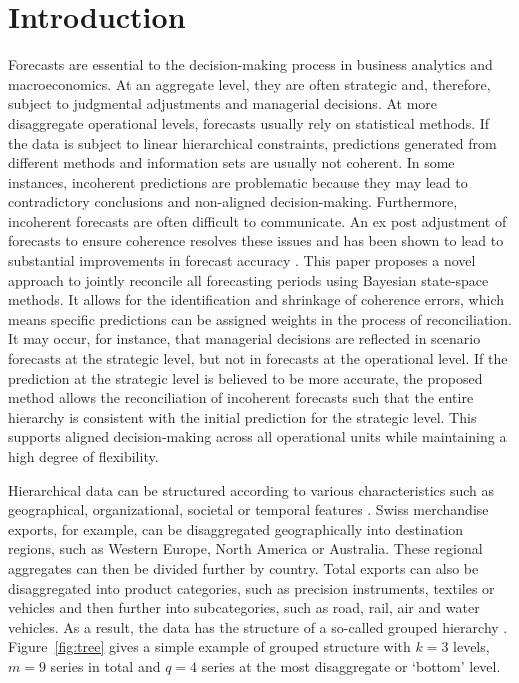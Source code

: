 \documentclass[a4paper,fleqn,11pt]{article}
\begin{document}
\section{Introduction}\label{sec:intro}

Forecasts are essential to the decision-making process in business analytics and macroeconomics. At an aggregate level, they are often strategic and, therefore, subject to judgmental adjustments and managerial decisions. At more disaggregate operational levels, forecasts usually rely on statistical methods. If the data is subject to linear hierarchical constraints, predictions generated from different methods and information sets are usually not coherent. In some instances, incoherent predictions are problematic because they may lead to contradictory conclusions and non-aligned decision-making. Furthermore, incoherent forecasts are often difficult to communicate. An ex post adjustment of forecasts to ensure coherence resolves these issues and has been shown to lead to substantial improvements in forecast accuracy \citep[see][and references therein]{Wickramasuriya2015}. This paper proposes a novel approach to jointly reconcile all forecasting periods using Bayesian state-space methods. It allows for the identification and shrinkage of coherence errors, which means specific predictions can be assigned weights in the process of reconciliation. It may occur, for instance, that managerial decisions are reflected in scenario forecasts at the strategic level, but not in forecasts at the operational level. If the prediction at the strategic level is believed to be more accurate, the proposed method allows the reconciliation of incoherent forecasts such that the entire hierarchy is consistent with the initial prediction for the strategic level. This supports aligned decision-making across all operational units while maintaining a high degree of flexibility.

Hierarchical data can be structured according to various characteristics such as geographical, organizational, societal or temporal features \citep{Kourentzes2019}. Swiss merchandise exports, for example, can be disaggregated geographically into destination regions, such as Western Europe, North America or Australia. These regional aggregates can then be divided further by country. Total exports can also be disaggregated into product categories, such as precision instruments, textiles or vehicles and then further into subcategories, such as road, rail, air and water vehicles. As a result, the data has the structure of a so-called grouped hierarchy \citep[see][and references therein]{Hyndman2018}. Figure~\ref{fig:tree} gives a simple example of grouped structure with $k = 3$ levels, $m = 9$ series in total and $q = 4$ series at the most disaggregate or `bottom' level. 
\end{document}
